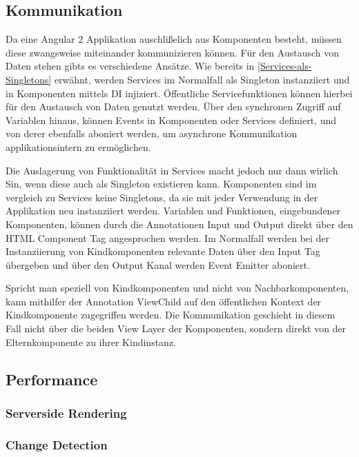 \subsection{Kommunikation}

Da eine Angular 2 Applikation auschlißelich aus Komponenten besteht, müssen diese zwangsweise miteinander
kommunizieren können. Für den Austausch von Daten stehen gibts es verschiedene Ansätze.
Wie bereits in \ref{Services-als-Singletons} erwähnt, werden Services im Normalfall als Singleton
instanziiert und in Komponenten mittels \ac{DI} injiziert. Öffentliche Servicefunktionen können hierbei für den
Austausch von Daten genutzt werden. Über den synchronen Zugriff auf Variablen hinaus,
können Events in Komponenten oder Services definiert, und von derer ebenfalls aboniert werden,
um asynchrone Kommunikation applikationsintern zu ermöglichen.

Die Auslagerung von Funktionalität in Services macht jedoch nur dann wirlich Sin,
wenn diese auch als Singleton existieren kann. Komponenten sind im vergleich zu Services keine Singletons,
da sie mit jeder Verwendung in der Applikation neu instanziiert werden.
Variablen und Funktionen, eingebundener Komponenten, können durch die Annotationen Input und Output
direkt über den HTML Component Tag angesprochen werden. Im Normalfall werden bei der Instanziierung von Kindkomponenten
relevante Daten über den Input Tag übergeben und über den Output Kanal werden Event Emitter aboniert. \cite{Angul94:online}

Spricht man speziell von Kindkomponenten und nicht von Nachbarkomponenten,
kann mithilfer der Annotation ViewChild auf den öffentlichen Kontext der Kindkomponente zugegriffen werden.
Die Kommunikation geschieht in diesem Fall nicht über die beiden View Layer der Komponenten,
sondern direkt von der Elternkomponente zu ihrer Kindinstanz. \cite{ViewC61:online}

\subsection{Performance}

\subsubsection{Serverside Rendering}

\subsubsection{Change Detection}

